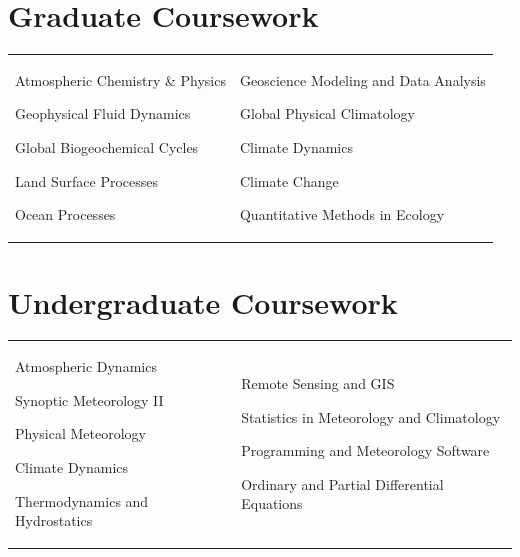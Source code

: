 \documentclass[margin,line,palatino,courier,10pt]{res}
\newenvironment{list1}{
  \begin{list}{\ding{113}}{%
      \setlength{\itemsep}{0in}
      \setlength{\parsep}{0in} \setlength{\parskip}{0in}
      \setlength{\topsep}{0in} \setlength{\partopsep}{0in}
      \setlength{\leftmargin}{0.17in}}}{\end{list}}
\begin{document}
\begin{resume}
\section{\sc \textcolor{Cerulean}{\large{\textbf{Graduate Coursework}}}}
\vspace{-0.3in}
\begin{tabular}{@{}p{2.2in}p{3in}}
\begin{list1}
\item Atmospheric Chemistry \& Physics 
\item Geophysical Fluid Dynamics
\item Global Biogeochemical Cycles
\item Land Surface Processes
\item Ocean Processes
\end{list1}
&
\begin{list1}
\item Geoscience Modeling and Data Analysis
\item Global Physical Climatology
\item Climate Dynamics
\item Climate Change
\item Quantitative Methods in Ecology
\end{list1}
\end{tabular}

\section{\sc \textcolor{Cerulean}{\large{\textbf{Undergraduate Coursework}}}}
\vspace{-0.1in}
\begin{tabular}{@{}p{2.2in}p{3in}}
\vspace*{0.04in}
\begin{list1}
\item Atmospheric Dynamics
\item Synoptic Meteorology II
\item Physical Meteorology
\item Climate Dynamics
\item Thermodynamics and Hydrostatics 
\end{list1}
&
\begin{list1}
\item Remote Sensing and GIS
\item Statistics in Meteorology and Climatology
\item Programming and Meteorology Software
\item Ordinary and Partial Differential Equations
\end{list1}


\end{tabular}
\end{resume}
\end{document}
